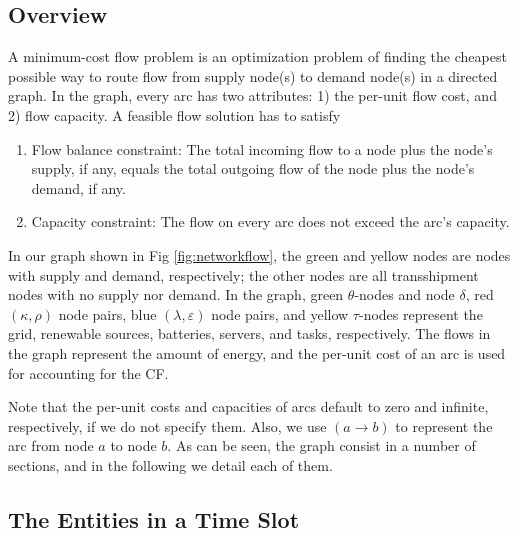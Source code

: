 \documentclass[conference, 10pt, ﬁnal, letterpaper, twocolumn]{IEEEtran}
\begin{document}
\subsection{Overview}
A minimum-cost flow problem is an optimization problem of finding the cheapest possible way to route flow from supply node(s) to demand node(s) in a directed graph. In the graph, every arc has two attributes: 1) the per-unit flow cost, and 2) flow capacity. A feasible flow solution has to satisfy
\begin{enumerate}
    \item Flow balance constraint: The total incoming flow to a node plus the node's supply, if any, equals the total outgoing flow of the node plus the node's demand, if any. 
    \item Capacity constraint: The flow on every arc does not exceed the arc's capacity.
\end{enumerate}

In our graph shown in Fig \ref{fig:networkflow}, the green and yellow nodes are nodes with supply and demand, respectively; the other nodes are all transshipment nodes with no supply nor demand. In the graph, green $\theta$-nodes and node $\delta$, red $(\kappa, \rho)$ node pairs, blue $(\lambda, \varepsilon)$ node pairs, and yellow $\tau$-nodes represent the grid, renewable sources, batteries, servers, and tasks, respectively. The flows in the graph represent the amount of energy, and the per-unit cost of an arc is used for accounting for the CF.

Note that the per-unit costs and capacities of arcs default to zero and infinite, respectively, if we do not specify them. Also, we use $(a\rightarrow b)$ to represent the arc from node $a$ to node $b$. As can be seen, the graph consist in a number of sections, and in the following we detail each of them.

\subsection{The Entities in a Time Slot} 
\end{document}
